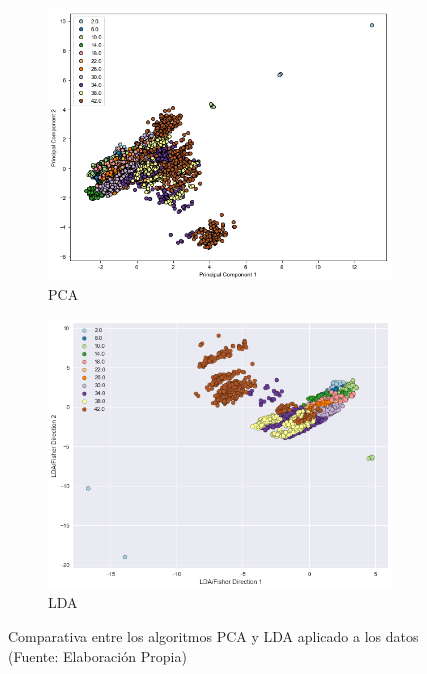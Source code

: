 \begin{figure}[ht!]
\begin{subfigure}{.5\textwidth}
  \centering
  \includegraphics[width=.4\linewidth]{figures/pca.png}
  \caption{PCA}
  \label{fig:sub1}
\end{subfigure}%
\begin{subfigure}{.5\textwidth}
  \centering
  \includegraphics[width=.4\linewidth]{figures/lda.png}
  \caption{LDA}
  \label{fig:sub2}
\end{subfigure}
\caption[abs]{Comparativa entre los algoritmos PCA y LDA aplicado a los datos \\
{\scriptsize (Fuente: Elaboración Propia)}}
\label{fig:pca_lda}
\end{figure}